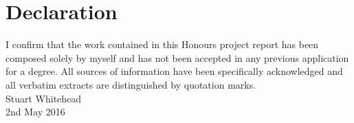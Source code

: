 \chapter{Declaration}
  I confirm that the work contained in this Honours project report has been composed solely by myself and has not been accepted in any previous application for a degree. All sources of information have been specifically acknowledged and all verbatim extracts are distinguished by quotation marks.\\[2cm]

  \noindent Stuart Whitehead\\
  2nd May 2016